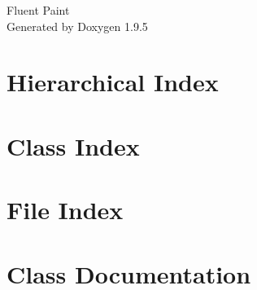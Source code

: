 \documentclass[twoside]{book}
\newcommand{\+}{\discretionary{\mbox{\scriptsize$\hookleftarrow$}}{}{}}
\newcommand{\clearemptydoublepage}{%
    \newpage{\pagestyle{empty}\cleardoublepage}%
  }
\begin{document}
  \raggedbottom
    \hypersetup{pageanchor=false,
                bookmarksnumbered=true,
                pdfencoding=unicode
               }
  \begin{titlepage}
  \vspace*{7cm}
  \begin{center}%
  {\Large Fluent Paint}\\
  \vspace*{1cm}
  {\large Generated by Doxygen 1.9.5}\\
  \end{center}
  \end{titlepage}
  \clearemptydoublepage
  \tableofcontents
  \clearemptydoublepage
  \hypersetup{pageanchor=true}
\chapter{Hierarchical Index}

\chapter{Class Index}

\chapter{File Index}

\chapter{Class Documentation}




























\end{document}

